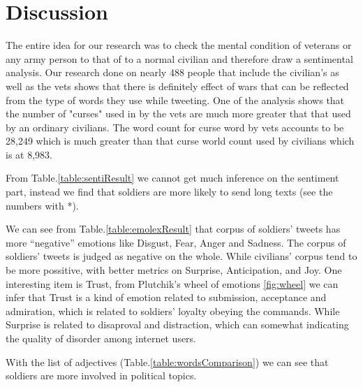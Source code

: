 \section{Discussion}

The entire idea for our research was to check the mental condition of veterans or any army person to that of to a normal civilian and therefore draw a sentimental analysis. Our research done on nearly 488 people that include the civilian’s as well as the vets shows that there is definitely effect of wars that can be reflected from the type of words they use while tweeting. One of the analysis shows that the number of "curses" used in by the vets are much more greater that that used by an ordinary civilians. The word count for curse word by vets accounts to be 28,249 which is much greater than that curse world count used by civilians which is at 8,983.

From Table.\ref{table:sentiResult} we cannot get much inference on the sentiment part, instead we find that soldiers are more likely to send long texts (see the numbers with *).

We can see from Table.\ref{table:emolexResult} that corpus of soldiers' tweets has more \enquote{negative} emotions like Disgust, Fear, Anger and Sadness. The corpus of soldiers' tweets is judged as negative on the whole. While civilians' corpus tend to be more possitive, with better metrics on Surprise, Anticipation, and Joy. One interesting item is Trust, from Plutchik’s wheel of emotions \ref{fig:wheel} we can infer that Trust is a kind of emotion related to submission, acceptance and admiration, which is related to soldiers' loyalty obeying the commands. While Surprise is related to disaproval and distraction, which can somewhat indicating the quality of disorder among internet users.

With the list of adjectives (Table.\ref{table:wordsComparison}) we can see that soldiers are more involved in political topics.
